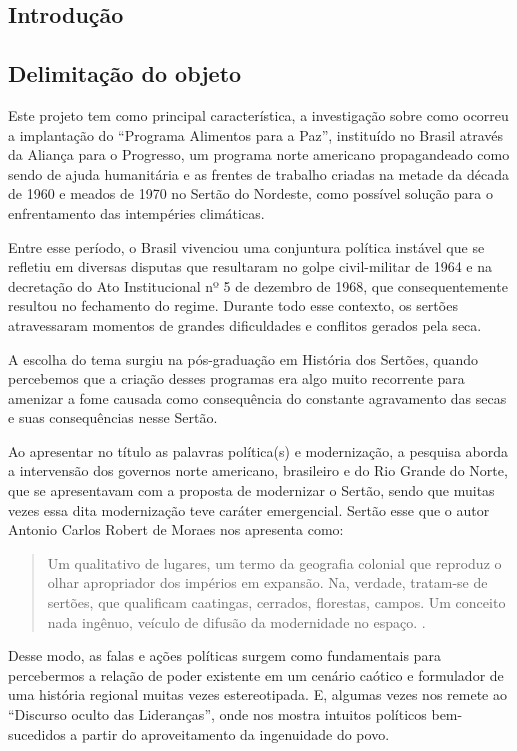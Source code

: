 \begin{refsection}
    \section{Introdução}

    \subsection{Delimitação do objeto}

    Este projeto tem como principal característica, a investigação sobre como ocorreu a implantação do ``Programa Alimentos para a Paz'', instituído no Brasil através da Aliança para o Progresso, um programa norte americano propagandeado como sendo de ajuda humanitária e as frentes de trabalho criadas na metade da década de 1960 e meados de 1970 no Sertão do Nordeste, como possível solução para o enfrentamento das intempéries climáticas.

    Entre esse período, o Brasil vivenciou uma conjuntura política instável que se refletiu em diversas disputas que resultaram no golpe civil-militar de 1964 e na decretação do Ato Institucional nº 5 de dezembro de 1968, que consequentemente resultou no fechamento do regime. Durante todo esse contexto, os sertões atravessaram momentos de grandes dificuldades e conflitos gerados pela seca. 

    A escolha do tema surgiu na pós-graduação em História dos Sertões, quando percebemos que a criação desses programas era algo muito recorrente para amenizar a fome causada como consequência do constante agravamento das secas e suas consequências nesse Sertão. 

    Ao apresentar no título as palavras política(s) e modernização, a pesquisa aborda a intervensão dos governos norte americano, brasileiro e do Rio Grande do Norte, que se apresentavam com a proposta de modernizar o Sertão, sendo que muitas vezes essa dita modernização teve caráter emergencial. Sertão esse que o autor Antonio Carlos Robert de Moraes nos apresenta como: 

    \begin{quotation}
        Um qualitativo de lugares, um termo da geografia colonial que reproduz o olhar apropriador dos impérios em expansão. Na, verdade, tratam-se de sertões, que qualificam caatingas, cerrados, florestas, campos. Um conceito nada ingênuo, veículo de difusão da modernidade no espaço. \cite[p.~5]{Moraes2003Sertao}. 
    \end{quotation}

    Desse modo, as falas e ações políticas surgem como fundamentais para percebermos a relação de poder existente em um cenário caótico e formulador de uma história regional muitas vezes estereotipada. E, algumas vezes nos remete ao ``Discurso oculto das Lideranças'', onde \cite[p.~72]{Neves2013Discurso} nos mostra intuitos políticos bem-sucedidos a partir do aproveitamento da ingenuidade do povo. 


\end{refsection}
